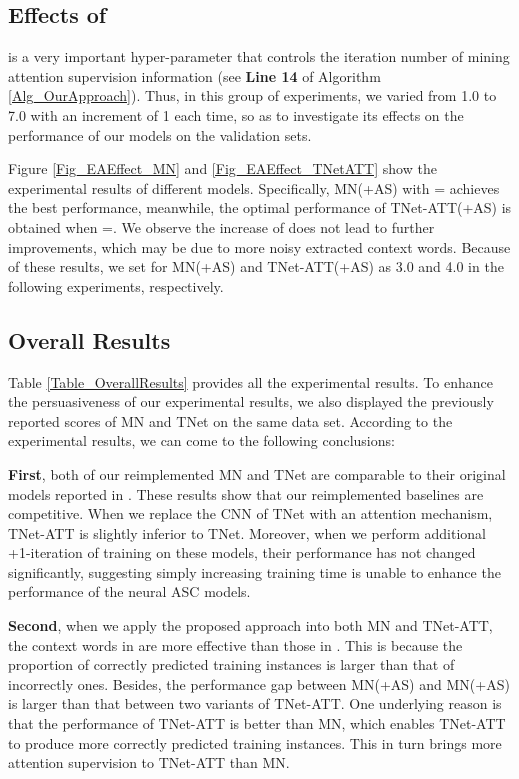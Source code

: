 \documentclass[11pt,a4paper]{article}
\begin{document}
\subsection{Effects of }
 is a very important hyper-parameter
that controls the iteration number of 
mining attention supervision information (see \textbf{Line 14} of Algorithm \ref{Alg_OurApproach}).
Thus,
in this group of experiments,
we varied  from 1.0 to 7.0 with an increment of 1 each time,
so as to investigate its effects on the performance of our models on the validation sets.

Figure \ref{Fig_EAEffect_MN} and \ref{Fig_EAEffect_TNetATT} show the experimental results of different models.
Specifically,
MN(+AS) with = achieves the best performance,
meanwhile,
the optimal performance of TNet-ATT(+AS) is obtained when =.
We observe
the increase of  does not lead to further improvements,
which may be due to more noisy extracted context words.
Because of these results,
we set  for MN(+AS) and TNet-ATT(+AS) as 3.0 and 4.0 in the following experiments,
respectively.


\subsection{Overall Results}
Table \ref{Table_OverallResults} provides all the experimental results.
To enhance the persuasiveness of our experimental results,
we also displayed the previously reported scores of MN \cite{Wang:ACL2018} and TNet \cite{Li:ACL2018} on the same data set.
According to the experimental results,
we can come to the following conclusions:

\textbf{First},
both of our reimplemented MN and TNet are comparable to their original models reported in \cite{Wang:ACL2018,Li:ACL2018}.
These results show that our reimplemented baselines are competitive.
When we replace the CNN of TNet with an attention mechanism,
TNet-ATT is slightly inferior to TNet.
Moreover,
when we perform additional +1-iteration of training on these models,
their performance has not changed significantly,
suggesting simply increasing training time is unable to enhance the performance of the neural ASC models.

\textbf{Second},
when we apply the proposed approach into both MN and TNet-ATT,
the context words in  are more effective than those in .
This is because the proportion of correctly predicted training instances is larger than that of incorrectly ones.
Besides,
the performance gap between MN(+AS) and MN(+AS) is larger than that between two variants of TNet-ATT.
One underlying reason is that the performance of TNet-ATT is better than MN,
which enables TNet-ATT to produce more correctly predicted training instances.
This in turn brings more attention supervision to TNet-ATT than MN.
\end{document}

